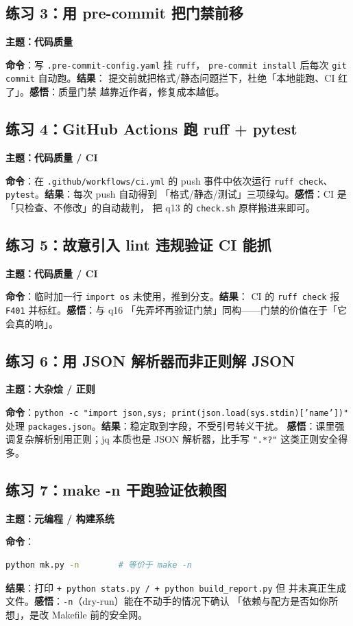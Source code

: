 \documentclass{hamesome-report}
\begin{document}
\subsection{练习 3：用 pre-commit 把门禁前移}
\textbf{主题：代码质量}\par
\textbf{命令}：写 \texttt{.pre-commit-config.yaml} 挂 \texttt{ruff}，
\texttt{pre-commit install} 后每次 \texttt{git commit} 自动跑。\textbf{结果}：
提交前就把格式/静态问题拦下，杜绝「本地能跑、CI 红了」。\textbf{感悟}：质量门禁
越靠近作者，修复成本越低。

\subsection{练习 4：GitHub Actions 跑 ruff + pytest}
\textbf{主题：代码质量 / CI}\par
\textbf{命令}：在 \texttt{.github/workflows/ci.yml} 的 push 事件中依次运行
\texttt{ruff\ check}、\texttt{pytest}。\textbf{结果}：每次 push 自动得到
「格式/静态/测试」三项绿勾。\textbf{感悟}：CI 是「只检查、不修改」的自动裁判，
把 q13 的 \texttt{check.sh} 原样搬进来即可。

\subsection{练习 5：故意引入 lint 违规验证 CI 能抓}
\textbf{主题：代码质量 / CI}\par
\textbf{命令}：临时加一行 \texttt{import os} 未使用，推到分支。\textbf{结果}：
CI 的 \texttt{ruff\ check} 报 \texttt{F401} 并标红。\textbf{感悟}：与 q16
「先弄坏再验证门禁」同构——门禁的价值在于「它会真的响」。

\subsection{练习 6：用 JSON 解析器而非正则解 JSON}
\textbf{主题：大杂烩 / 正则}\par
\textbf{命令}：\texttt{python -c "import json,sys; print(json.load(sys.stdin)['name'])"}
处理 \texttt{packages.json}。\textbf{结果}：稳定取到字段，不受引号转义干扰。
\textbf{感悟}：课里强调复杂解析别用正则；jq 本质也是 JSON 解析器，比手写
\texttt{".*?"} 这类正则安全得多。

\subsection{练习 7：make -n 干跑验证依赖图}
\textbf{主题：元编程 / 构建系统}\par
\textbf{命令}：
\begin{lstlisting}[language=bash]
python mk.py -n        # 等价于 make -n
\end{lstlisting}
\textbf{结果}：打印 \texttt{+ python stats.py / + python build\_report.py} 但
并未真正生成文件。\textbf{感悟}：\texttt{-n}（dry-run）能在不动手的情况下确认
「依赖与配方是否如你所想」，是改 Makefile 前的安全网。
\end{document}
